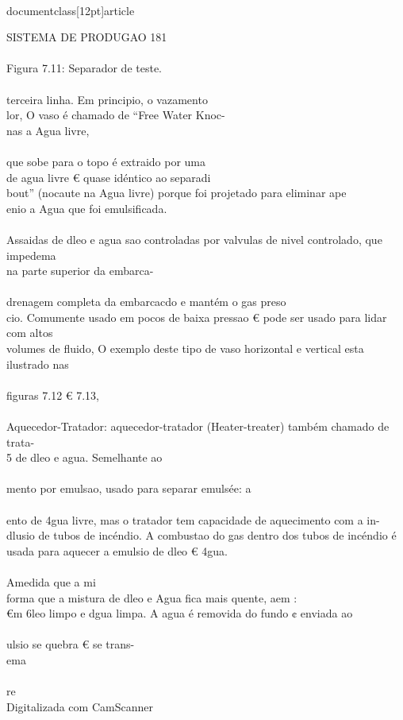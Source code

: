 \\documentclass[12pt]{article}
\begin{document}
SISTEMA DE PRODUGAO 181\\
\\
Figura 7.11: Separador de teste.\\
\\
terceira linha. Em principio, o vazamento\\
lor, O vaso é chamado de “Free Water Knoc-\\
nas a Agua livre,\\
\\
que sobe para o topo é extraido por uma\\
de agua livre € quase idéntico ao separadi\\
bout” (nocaute na Agua livre) porque foi projetado para eliminar ape\\
enio a Agua que foi emulsificada.\\
\\
Assaidas de dleo e agua sao controladas por valvulas de nivel controlado, que impedema\\
na parte superior da embarca-\\
\\
drenagem completa da embarcacdo e mantém o gas preso\\
cio. Comumente usado em pocos de baixa pressao € pode ser usado para lidar com altos\\
volumes de fluido, O exemplo deste tipo de vaso horizontal e vertical esta ilustrado nas\\
\\
figuras 7.12 € 7.13,\\
\\
Aquecedor-Tratador: aquecedor-tratador (Heater-treater) também chamado de trata-\\
5 de dleo e agua. Semelhante ao\\
\\
mento por emulsao, usado para separar emulsée: a\\
\\
ento de 4gua livre, mas o tratador tem capacidade de aquecimento com a in-\\
dlusio de tubos de incéndio. A combustao do gas dentro dos tubos de incéndio é\\
usada para aquecer a emulsio de dleo € 4gua.\\
\\
Amedida que a mi\\
forma que a mistura de dleo e Agua fica mais quente, aem :\\
€m 6leo limpo e dgua limpa. A agua é removida do fundo ¢ enviada ao\\
\\
ulsio se quebra € se trans-\\
ema\\
\\
re\\
Digitalizada com CamScanner\\
\end{document}
